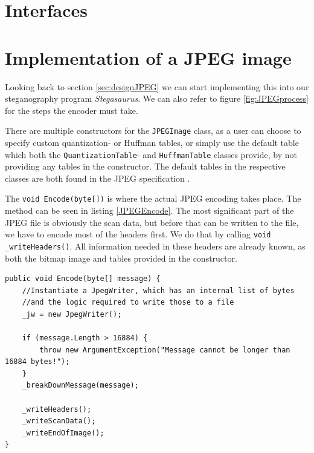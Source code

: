 \section{Interfaces}
\section{Implementation of a JPEG image}
Looking back to section \ref{sec:designJPEG} we can start implementing this into our steganography program \textit{Stegasaurus}.
We can also refer to figure \ref{fig:JPEGprocess} for the steps the encoder must take.

There are multiple constructors for the \lstinline|JPEGImage| class, as a user can choose to specify custom quantization- or Huffman tables, or simply use the default table which both the \lstinline|QuantizationTable|- and \lstinline|HuffmanTable| classes provide, by not providing any tables in the constructor.
The default tables in the respective classes are both found in the JPEG specification \citep[Annex k]{JPEGStandard}.

The \lstinline|void Encode(byte[])| is where the actual JPEG encoding takes place.
The method can be seen in listing \ref{JPEGEncode}.
The most significant part of the JPEG file is obviously the scan data, but before that can be written to the file, we have to encode most of the headers first.
We do that by calling \lstinline|void _writeHeaders()|.
All information needed in these headers are already known, as both the bitmap image and tables provided in the constructor.

\begin{lstlisting}[firstnumber=136,label=JPEGEncode, caption={\lstinline|JPEGImage.Encode| method \textbf{File: }JPEGImage.cs}]
public void Encode(byte[] message) {
    //Instantiate a JpegWriter, which has an internal list of bytes 
    //and the logic required to write those to a file
    _jw = new JpegWriter();

    if (message.Length > 16884) {
        throw new ArgumentException("Message cannot be longer than 16884 bytes!");
    }
    _breakDownMessage(message);

    _writeHeaders();
    _writeScanData();
    _writeEndOfImage();
}
\end{lstlisting}

